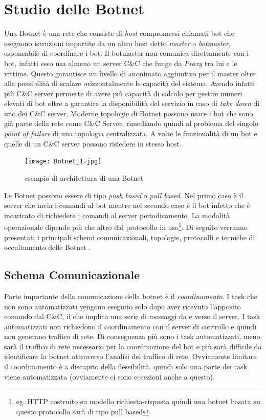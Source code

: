 

\chapter{Studio delle Botnet}

Una Botnet è una rete che consiste di  \textit{host} compromessi chiamati bot che eseguono istruzioni impartite da un altro host detto \emph{master} o \emph{botmaster}, esponsabile di coordinare i bot. Il botmaster non comunica direttamente con i bot, infatti esso usa almeno un server C\&C che funge da \emph{Proxy} tra lui e le vittime. Questo garantisce un livello di anonimato aggiuntivo per il master oltre alla possibilità di scalare orizzontalmente le capacità del sistema. Avendo infatti più C\&C server permette di avere più capacità di calcolo per gestire numeri elevati di bot oltre a garantire la disponibilità del servizio in caso di \emph{take down} di uno dei C\&C server. Moderne topologie di Botnet possono usare i bot che sono già parte della rete come C\&C Server, rimediando quindi al problema del singolo \textit{point of failure} di una topologia centralizzata.
A volte le funzionalità di un bot e quelle di un C\&C server possono risiedere in stesso host.

\begin{figure}[htb]
    \centering
    \texttt{[image: Botnet\_1.jpg]}
    \caption{esempio di architettura di una Botnet\cite{BotnetExampleImage}}
    \label{fig:botnetexample}
\end{figure}
Le Botnet possono essere di tipo \emph{push based} o \emph{pull based}. Nel primo caso è il server che invia i comandi al bot mentre nel secondo caso è il bot infetto che è incaricato di richiedere i comandi al server periodicamente.
 La modalità operazionale  dipende più che altro dal protocollo in uso\footnote{eg. HTTP costruito su modello richiesta-risposta quindi una botnet basata su questo protocollo sarà di tipo pull based}.
 Di seguito verranno presentati i principali schemi comunicazionali, topologie, protocolli e tecniche di occultamento delle Botnet \cite{vormayr2017botnet,vuong2011advanced}.


\section{Schema Comunicazionale}
Parte importante della comunicazione della botnet è il \emph{coordinamento}. I task che non sono automatizzati vengono eseguito solo dopo aver ricevuto l'apposito comando dal C\&C, il che implica una serie di messaggi da e verso il server. I task automatizzati non richiedono il coordinamento con il server di controllo e quindi non generano traffico di rete. Di conseguenza più sono i task automatizzati, meno sarà il traffico di rete necessario per la coordinazione del bot e più sarà difficile da identificare la botnet attraverso l'analisi del traffico di rete. Ovviamente limitare il coordinamento è a discapito della flessibilità, quindi solo una parte dei task viene automatizzata (ovviamente ci sono eccezioni anche a questo). 

